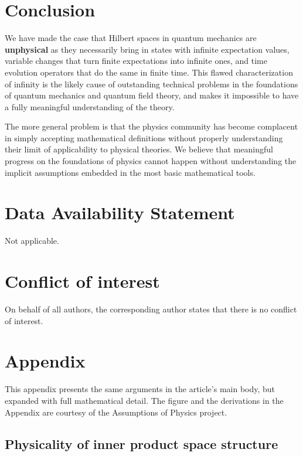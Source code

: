 \documentclass[10pt,twocolumn, nofootinbib]{revtex4-2}
\begin{document}
\section{Conclusion}

We have made the case that Hilbert spaces in quantum mechanics are \textbf{unphysical} as they necessarily bring in states with infinite expectation values, variable changes that turn finite expectations into infinite ones, and time evolution operators that do the same in finite time. This flawed characterization of infinity is the likely cause of outstanding technical problems in the foundations of quantum mechanics and quantum field theory, and makes it impossible to have a fully meaningful understanding of the theory.

The more general problem is that the physics community has become complacent in simply accepting mathematical definitions without properly understanding their limit of applicability to physical theories. We believe that meaningful progress on the foundations of physics cannot happen without understanding the implicit assumptions embedded in the most basic mathematical tools.

\section*{Data Availability Statement}
Not applicable.


\section*{Conflict of interest}
On behalf of all authors, the corresponding author states that there is no conflict of interest. 



\newcommand{\pj}[1] {\underbar{$#1$}}

\section*{Appendix}

This appendix presents the same arguments in the article's main body, but expanded with full mathematical detail. The figure and the derivations in the Appendix are courtesy of the Assumptions of Physics project. \cite{aop-book}

\subsection{Physicality of inner product space structure}
\end{document}
